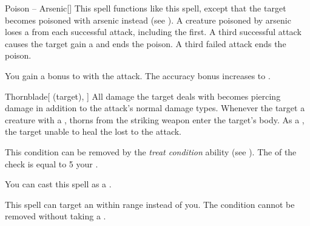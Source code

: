 \lowercase{\hypertarget{spell:Poison -- Arsenic}{}}\label{spell:Poison -- Arsenic}
\begin{freeability}[Rank 3]{\hypertarget{spell:Poison -- Arsenic}{Poison -- Arsenic}}[]
This spell functions like this  spell, except that the target becomes poisoned with arsenic instead (see ).
A creature poisoned by arsenic loses a  from each successful attack, including the first.
A third successful attack causes the target gain a  and ends the poison.
A third failed attack ends the poison.

\rankline
{} You gain a  bonus to  with the attack.
 The accuracy bonus increases to .

\end{freeability}
\vspace{0.25em}



\lowercase{\hypertarget{spell:Thornblade}{}}\label{spell:Thornblade}
\begin{attuneability}[Rank 3]{\hypertarget{spell:Thornblade}{Thornblade}}[ (target), ]
All damage the target deals with  becomes piercing damage in addition to the attack's normal damage types.
Whenever the target  a creature with a , thorns from the striking weapon enter the target's body.
As a , the target unable to heal the  lost to the attack.

This condition can be removed by the \textit{treat condition} ability (see ).
The  of the check is equal to 5 \add your .

You can cast this spell as a .

\rankline
{} This spell can target an  within \rngmed range instead of you.
 The condition cannot be removed without taking a .

\end{attuneability}
\vspace{0.25em}



